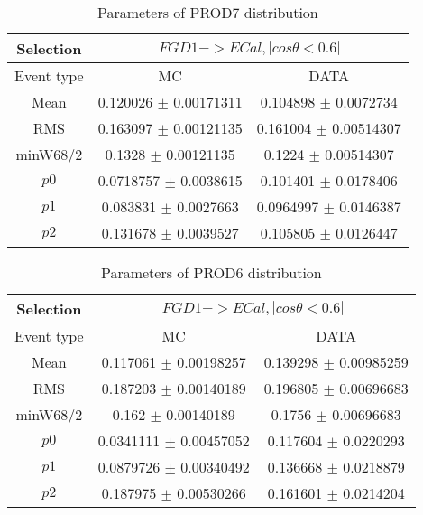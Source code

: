 \documentclass[a4paper,12pt]{article}
\begin{document}
\begin{table}[htbp]
\begin{center}
\begin{tabular}{|c|c|c|}
        \hline
        Selection & \multicolumn{2}{|c|}{$FGD1->ECal, |cos\theta<0.6|$}  \\ \hline
        Event type & MC & DATA \\ 
        \hline
        Mean & 0.120026 $\pm$ 0.00171311 & 0.104898 $\pm$ 0.0072734 \\ 
        \hline 
        RMS & 0.163097 $\pm$ 0.00121135 & 0.161004 $\pm$ 0.00514307 \\ 
        \hline 
        minW68/2 & 0.1328 $\pm$ 0.00121135 & 0.1224 $\pm$ 0.00514307 \\ 
        \hline 
        $p0$ & 0.0718757 $\pm$ 0.0038615 & 0.101401 $\pm$ 0.0178406 \\ 
        \hline 
        $p1$ & 0.083831 $\pm$ 0.0027663 & 0.0964997 $\pm$ 0.0146387 \\ 
        \hline 
        $p2$ & 0.131678 $\pm$ 0.0039527 & 0.105805 $\pm$ 0.0126447 \\ 
        \hline 
\end{tabular}
\caption{Parameters of PROD7 distribution } \vspace{0.2in}
\label{xxx}
\end{center}
\end{table}
\begin{table}[htbp]
\begin{center}
\begin{tabular}{|c|c|c|}
        \hline
        Selection & \multicolumn{2}{|c|}{$FGD1->ECal, |cos\theta<0.6|$}  \\ \hline
        Event type & MC & DATA \\ 
        \hline
        Mean & 0.117061 $\pm$ 0.00198257 & 0.139298 $\pm$ 0.00985259 \\ 
        \hline 
        RMS & 0.187203 $\pm$ 0.00140189 & 0.196805 $\pm$ 0.00696683 \\ 
        \hline 
        minW68/2 & 0.162 $\pm$ 0.00140189 & 0.1756 $\pm$ 0.00696683 \\ 
        \hline 
        $p0$ & 0.0341111 $\pm$ 0.00457052 & 0.117604 $\pm$ 0.0220293 \\ 
        \hline 
        $p1$ & 0.0879726 $\pm$ 0.00340492 & 0.136668 $\pm$ 0.0218879 \\ 
        \hline 
        $p2$ & 0.187975 $\pm$ 0.00530266 & 0.161601 $\pm$ 0.0214204 \\ 
        \hline 
\end{tabular}
\caption{Parameters of PROD6 distribution } \vspace{0.2in}
\label{xxx}
\end{center}
\end{table}
\end{document}
